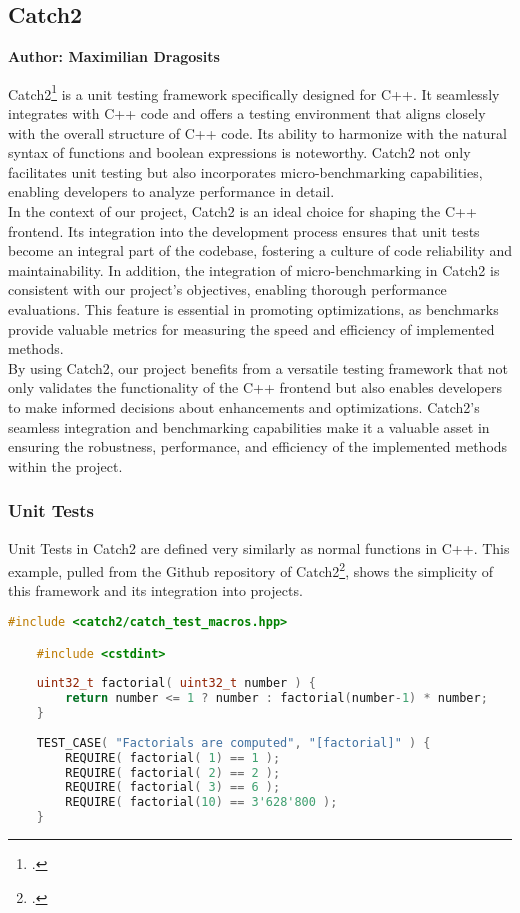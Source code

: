 \subsection{Catch2}
\textbf{Author: Maximilian Dragosits}

Catch2\footcite{catch2_git} is a unit testing framework specifically designed for C++. It seamlessly integrates with C++ code and offers a testing environment 
that aligns closely with the overall structure of C++ code. Its ability to harmonize with the natural syntax of functions and boolean expressions is noteworthy. 
Catch2 not only facilitates unit testing but also incorporates micro-benchmarking capabilities, enabling developers to analyze performance in detail.\\

In the context of our project, Catch2 is an ideal choice for shaping the C++ frontend. Its integration into the development process ensures that unit tests 
become an integral part of the codebase, fostering a culture of code reliability and maintainability. In addition, the integration of micro-benchmarking in Catch2 
is consistent with our project's objectives, enabling thorough performance evaluations. This feature is essential in promoting optimizations, as benchmarks provide 
valuable metrics for measuring the speed and efficiency of implemented methods.\\

By using Catch2, our project benefits from a versatile testing framework that not only validates the functionality of the C++ frontend but also enables developers 
to make informed decisions about enhancements and optimizations. Catch2's seamless integration and benchmarking capabilities make it a valuable asset in ensuring 
the robustness, performance, and efficiency of the implemented methods within the project.

\subsubsection{Unit Tests}

Unit Tests in Catch2 are defined very similarly as normal functions in C++. This example, pulled from the Github repository of Catch2\footcite{catch2_git}, shows the simplicity of
this framework and its integration into projects.

\begin{minipage}{\textwidth}
\begin{lstlisting}[language=C++, caption=Example of Catch2 test definition]
    #include <catch2/catch_test_macros.hpp>

    #include <cstdint>
    
    uint32_t factorial( uint32_t number ) {
        return number <= 1 ? number : factorial(number-1) * number;
    }
    
    TEST_CASE( "Factorials are computed", "[factorial]" ) {
        REQUIRE( factorial( 1) == 1 );
        REQUIRE( factorial( 2) == 2 );
        REQUIRE( factorial( 3) == 6 );
        REQUIRE( factorial(10) == 3'628'800 );
    }
\end{lstlisting}
\end{minipage}

